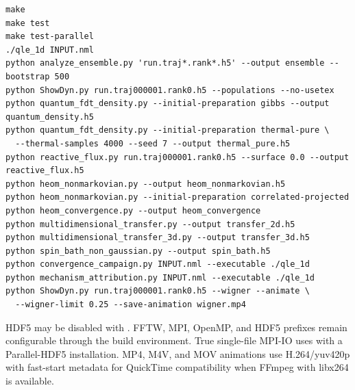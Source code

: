 \documentclass[11pt]{article}
\newcommand{\code}[1]{\texttt{\detokenize{#1}}}
\begin{document}
\begingroup
\footnotesize
\begin{verbatim}
make
make test
make test-parallel
./qle_1d INPUT.nml
python analyze_ensemble.py 'run.traj*.rank*.h5' --output ensemble --bootstrap 500
python ShowDyn.py run.traj000001.rank0.h5 --populations --no-usetex
python quantum_fdt_density.py --initial-preparation gibbs --output quantum_density.h5
python quantum_fdt_density.py --initial-preparation thermal-pure \
  --thermal-samples 4000 --seed 7 --output thermal_pure.h5
python reactive_flux.py run.traj000001.rank0.h5 --surface 0.0 --output reactive_flux.h5
python heom_nonmarkovian.py --output heom_nonmarkovian.h5
python heom_nonmarkovian.py --initial-preparation correlated-projected
python heom_convergence.py --output heom_convergence
python multidimensional_transfer.py --output transfer_2d.h5
python multidimensional_transfer_3d.py --output transfer_3d.h5
python spin_bath_non_gaussian.py --output spin_bath.h5
python convergence_campaign.py INPUT.nml --executable ./qle_1d
python mechanism_attribution.py INPUT.nml --executable ./qle_1d
python ShowDyn.py run.traj000001.rank0.h5 --wigner --animate \
  --wigner-limit 0.25 --save-animation wigner.mp4
\end{verbatim}
\endgroup

{\small HDF5 may be disabled with \code{make USE_HDF5=0}. FFTW, MPI, OpenMP, and
HDF5 prefixes remain configurable through the build environment. True single-file
MPI-IO uses \code{USE_PARALLEL_HDF5=1} with a Parallel-HDF5 installation.
MP4, M4V, and MOV animations use H.264/yuv420p with fast-start metadata for
QuickTime compatibility when FFmpeg with libx264 is available.}
\end{document}
